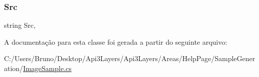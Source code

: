 \subsubsection{\texorpdfstring{Src}{Src}}
{\footnotesize\ttfamily string Src\hspace{0.3cm}{\ttfamily [get]}, {}}



A documentação para esta classe foi gerada a partir do seguinte arquivo\+:\begin{DoxyCompactItemize}
\item 
C\+:/\+Users/\+Bruno/\+Desktop/\+Api3\+Layers/\+Api3\+Layers/\+Areas/\+Help\+Page/\+Sample\+Generation/\hyperlink{ImageSample_8cs}{Image\+Sample.\+cs}\end{DoxyCompactItemize}
